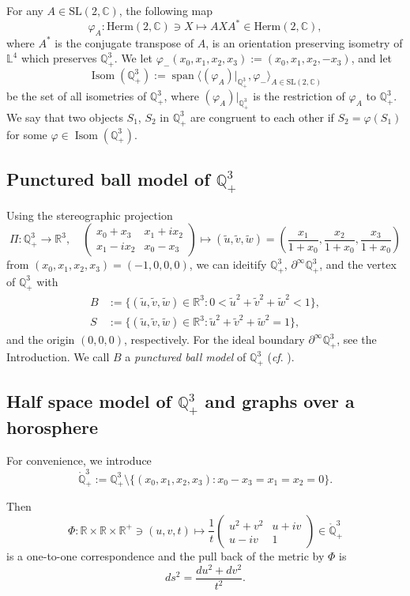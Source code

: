 \documentclass[12pt,reqno]{amsart}
\theoremstyle{plain} %
\theoremstyle{definition}
\numberwithin{equation}{section}
\newcommand{\sltc}{\mathrm{SL}(2,\mathbb{C})}
\newcommand{\hermtwo}{\mathrm{Herm}(2,\mathbb{C})}
\newcommand{\qthreep}{\mathbb{Q}^3_+}
\newcommand{\qthreept}{\mathring{\mathbb{Q}}^3_+}
\newcommand{\lfour}{\mathbb{L}^4}
\begin{document}
For any $A \in \sltc$, the following map
$$
	\varphi_A: \hermtwo \ni X \mapsto A X A^* \in \hermtwo,
$$
where $A^*$ is the conjugate transpose of $A$, is an orientation preserving isometry of $\lfour$ which
preserves $\qthreep$.
We let $\varphi_-(x_0,x_1,x_2,x_3) := (x_0,x_1,x_2,-x_3)$, and let
$$
	\operatorname{Isom}(\qthreep) := \operatorname{span} \langle (\varphi_A)|_{\qthreep}, \varphi_- \rangle_{A \in \sltc}
$$
be the set of all isometries of $\qthreep$, where $(\varphi_A)|_{\qthreep}$ is the restriction of $\varphi_A$ to $\qthreep$.
We say that two objects $S_1$, $S_2$ in $\qthreep$ are congruent to each other if $S_2= \varphi(S_1)$ for some $\varphi \in \operatorname{Isom}(\qthreep)$.

\subsection{Punctured ball model of $\qthreep$}
Using the stereographic projection
$$
	\Pi : \qthreep \to \mathbb{R}^3,  \quad
	\begin{pmatrix} x_0 + x_3 & x_1 + i x_2 \\ x_1 - i x_2 & x_0 - x_3 \end{pmatrix} \mapsto
	(\tilde{u},\tilde{v},\tilde{w}) = \left( \frac{x_1}{1+x_0}, \frac{x_2}{1+x_0}, \frac{x_3}{1+x_0} \right)
$$
from $(x_0,x_1,x_2,x_3)=(-1,0,0,0)$, we can ideitify $\qthreep$, $\partial^\infty\qthreep$, and the vertex of $\qthreep$ with
\begin{align*}
	B & := \{ (\tilde{u},\tilde{v},\tilde{w}) \in \mathbb{R}^3 : 0 < \tilde{u}^2+\tilde{v}^2+\tilde{w}^2< 1\}, \\
	S & := \{ (\tilde{u},\tilde{v},\tilde{w}) \in \mathbb{R}^3 : \tilde{u}^2+\tilde{v}^2+\tilde{w}^2 = 1\},
\end{align*}
and the origin $(0,0,0)$, respectively.
For the ideal boundary $\partial^\infty\qthreep$, see the Introduction.
We call $B$ a {\it punctured ball model} of $\qthreep$ (\textit{cf}. \cite{CLLY}).

\subsection{Half space model of $\qthreep$ and graphs over a horosphere}

For convenience, we introduce
$$
	\qthreept := \qthreep \setminus \{ (x_0,x_1,x_2,x_3) : x_0-x_3 = x_1 = x_2 = 0\}.
$$

Then
\begin{equation}\label{Eq:202601170935PM}
	\Phi: \mathbb{R}\times \mathbb{R}\times\mathbb{R}^+ \ni (u,v,t) \mapsto \frac{1}{t} \begin{pmatrix} u^2+v^2 & u+iv \\ u-iv & 1 \end{pmatrix} \in \qthreept
\end{equation}
is a one-to-one correspondence and the pull back of the metric by $\Phi$ is
\begin{equation}\label{202602210753AM}
	ds^2 = \frac{du^2+dv^2}{t^2}.
\end{equation}
\end{document}
